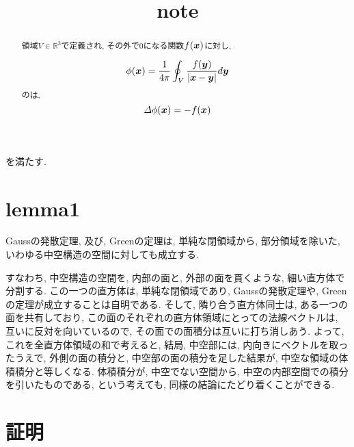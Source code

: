 \documentclass{jsarticle} \usepackage[dvipdfmx]{graphicx} \usepackage[dvipdfmx]{hyperref}
\title{note}
\newcommand*{\mbold}[1]{\mbox{\boldmath $#1$}}
\begin{document}
\maketitle

\begin{abstract}
  領域$V \in \mathbb{R}^3$で定義され, その外で$0$になる関数$f(\mbold{x})$に対し, 
  
  \begin{equation}
    \phi(\mbold{x}) = \frac{1}{4\pi} \oint_V \frac{f(\mbold{y})}{|\mbold{x} - \mbold{y}|}d\mbold{y}
  \end{equation}
  のは, 
  \begin{equation}
    \varDelta \phi(\mbold{x}) = -f(\mbold{x})
  \end{equation}
\end{abstract}

を満たす. 

\section{lemma1}
Gaussの発散定理, 及び, Greenの定理は, 単純な閉領域から, 部分領域を除いた, いわゆる中空構造の空間に対しても成立する. 

すなわち, 中空構造の空間を, 内部の面と, 外部の面を貫くような, 細い直方体で分割する. 
この一つの直方体は, 単純な閉領域であり, Gaussの発散定理や, Greenの定理が成立することは自明である. 
そして, 隣り合う直方体同士は, ある一つの面を共有しており, この面のそれぞれの直方体領域にとっての法線ベクトルは, 互いに反対を向いているので, 
その面での面積分は互いに打ち消しあう. 
よって, これを全直方体領域の和で考えると, 結局, 中空部には, 内向きにベクトルを取ったうえで, 外側の面の積分と, 中空部の面の積分を足した結果が, 中空な領域の体積積分と等しくなる. 
体積積分が, 中空でない空間から, 中空の内部空間での積分を引いたものである, という考えても, 同様の結論にたどり着くことができる. 

\section{証明}
\end{document}
